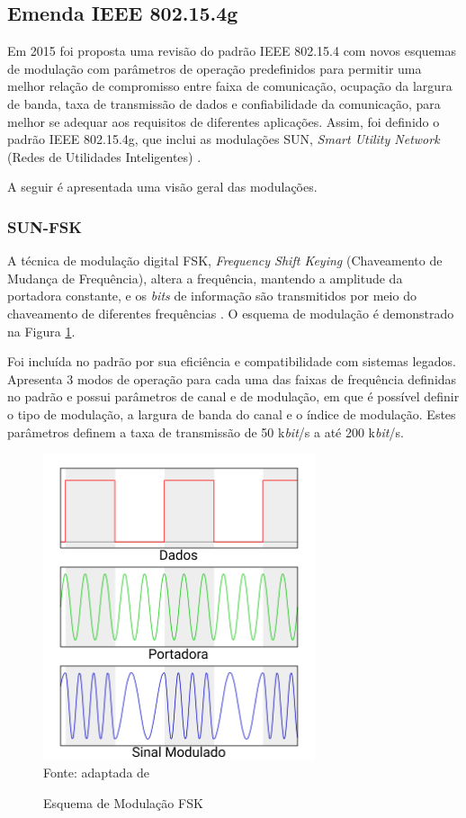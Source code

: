 \subsection{Emenda IEEE 802.15.4g}
Em 2015 foi proposta uma revisão do padrão IEEE 802.15.4 com novos esquemas de modulação com parâmetros de operação predefinidos para permitir uma melhor relação de compromisso entre faixa de comunicação, ocupação da largura de banda, taxa de transmissão de dados e confiabilidade da comunicação, para melhor se adequar aos requisitos de diferentes aplicações. Assim, foi definido o padrão IEEE 802.15.4g, que inclui as modulações SUN, \emph{Smart Utility Network} (Redes de Utilidades Inteligentes) \cite{tuset2020reliability}.

A seguir é apresentada uma visão geral das modulações.

\subsubsection{SUN-FSK}
A técnica de modulação digital FSK, \emph{Frequency Shift Keying} (Chaveamento de Mudança de Frequência), altera a frequência, mantendo a amplitude da portadora constante, e os \emph{bits} de informação são transmitidos por meio do chaveamento de diferentes frequências \cite{lathi2012}. O esquema de modulação é demonstrado na Figura \ref{fig:fsk}.

Foi incluída no padrão por sua eficiência e compatibilidade com sistemas legados. Apresenta 3 modos de operação para cada uma das faixas de frequência definidas no padrão e possui parâmetros de canal e de modulação, em que é possível definir o tipo de modulação, a largura de banda do canal e o índice de modulação. Estes parâmetros definem a taxa de transmissão de 50 k\emph{bit}/s a até 200 k\emph{bit}/s.

\begin{figure}[ht!]
      \begin{center}
            \caption{Esquema de Modulação FSK}
            \includegraphics[width=8cm]{./sections/textual/chapters/images/Fsk.png}\\
            Fonte: adaptada de \cite{figFSK}
            \label{fig:fsk}
      \end{center}
\end{figure}


